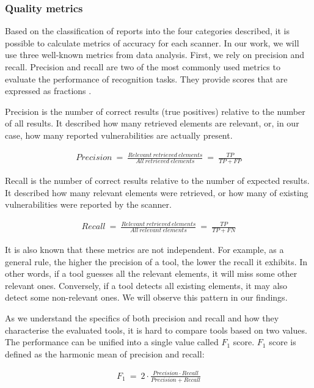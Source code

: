 \subsubsection*{Quality metrics}

Based on the classification of reports into the four categories described, it is possible to calculate metrics of accuracy for each scanner. In our work, we will use three well-known metrics from data analysis. First, we rely on precision and recall. Precision and recall are two of the most commonly used metrics to evaluate the performance of recognition tasks. They provide scores that are expressed as fractions \cite{a:recall}.

Precision is the number of correct results (true positives) relative to the number of all results. It described how many retrieved elements are relevant, or, in our case, how many reported vulnerabilities are actually present.

\begin{align*}
    Precision \ = \ \frac{Relevant \ retrieved \ elements}{All \ retrieved \ elements} \ = \ \frac{TP}{TP + FP}
\end{align*}


Recall is the number of correct results relative to the number of expected results. It described how many relevant elements were retrieved, or how many of existing vulnerabilities were reported by the scanner.

\begin{align*}
    Recall \ = \ \frac{Relevant \ retrieved \ elements}{All \ relevant \ elements} \ = \ \frac{TP}{TP + FN}
\end{align*}

It is also known that these metrics are not independent. For example, as a general rule, the higher the precision of a tool, the lower the recall it exhibits. In other words, if a tool guesses all the relevant elements, it will miss some other relevant ones. Conversely, if a tool detects all existing elements, it may also detect some non-relevant ones. We will observe this pattern in our findings.

As we understand the specifics of both precision and recall and how they characterise the evaluated tools, it is hard to compare tools based on two values. The performance can be unified into a single value called $F_1$ score. $F_1$ score is defined as the harmonic mean of precision and recall:

\begin{align*}
    F_1 \ = \ 2 \cdot \frac{Precision \cdot Recall}{Precision + Recall}
\end{align*}

